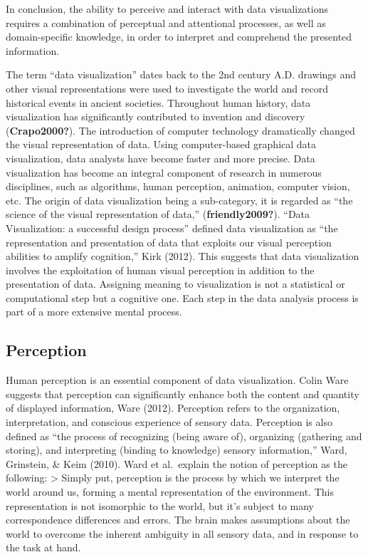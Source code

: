 \documentclass[print]{nuthesis}
\begin{document}
In conclusion, the ability to perceive and interact with data visualizations requires a combination of perceptual and attentional processes, as well as domain-specific knowledge, in order to interpret and comprehend the presented information.

The term ``data visualization'' dates back to the 2nd century A.D. drawings and other visual representations were used to investigate the world and record historical events in ancient societies.
Throughout human history, data visualization has significantly contributed to invention and discovery (\textbf{Crapo2000?}).
The introduction of computer technology dramatically changed the visual representation of data.
Using computer-based graphical data visualization, data analysts have become faster and more precise.
Data visualization has become an integral component of research in numerous disciplines, such as algorithms, human perception, animation, computer vision, etc.
The origin of data visualization being a sub-category, it is regarded as ``the science of the visual representation of data,'' (\textbf{friendly2009?}).
``Data Visualization: a successful design process'' defined data visualization as ``the representation and presentation of data that exploits our visual perception abilities to amplify cognition,'' Kirk (2012).
This suggests that data visualization involves the exploitation of human visual perception in addition to the presentation of data.
Assigning meaning to visualization is not a statistical or computational step but a cognitive one.
Each step in the data analysis process is part of a more extensive mental process.

\hypertarget{perception}{%
\subsection{Perception}\label{perception}}

Human perception is an essential component of data visualization.
Colin Ware suggests that perception can significantly enhance both the content and quantity of displayed information, Ware (2012).
Perception refers to the organization, interpretation, and conscious experience of sensory data.
Perception is also defined as ``the process of recognizing (being aware of), organizing (gathering and storing), and interpreting (binding to knowledge) sensory information,'' Ward, Grinstein, \& Keim (2010).
Ward et al.~explain the notion of perception as the following:
\textgreater{} Simply put, perception is the process by which we interpret the world around us, forming a mental representation of the environment. This representation is not isomorphic to the world, but it's subject to many correspondence differences and errors. The brain makes assumptions about the world to overcome the inherent ambiguity in all sensory data, and in response to the task at hand.
\end{document}
